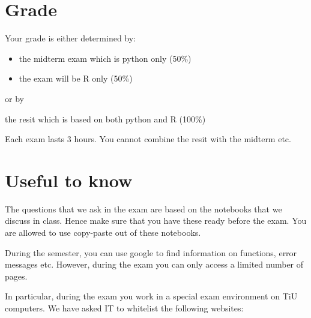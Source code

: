 \documentclass[]{book}
\providecommand{\tightlist}{%
  \setlength{\itemsep}{0pt}\setlength{\parskip}{0pt}}
\begin{document}
\hypertarget{grade}{%
\section{Grade}\label{grade}}

Your grade is either determined by:

\begin{itemize}
\tightlist
\item
  the midterm exam which is python only (50\%)
\item
  the exam will be R only (50\%)
\end{itemize}

or by

the resit which is based on both python and R (100\%)

Each exam lasts 3 hours. You cannot combine the resit with the midterm etc.

\hypertarget{useful-to-know}{%
\section{Useful to know}\label{useful-to-know}}

The questions that we ask in the exam are based on the notebooks that we discuss in class. Hence make sure that you have these ready before the exam. You are allowed to use copy-paste out of these notebooks.

During the semester, you can use google to find information on functions, error messages etc. However, during the exam you can only access a limited number of pages.

In particular, during the exam you work in a special exam environment on TiU computers. We have asked IT to whitelist the following websites:
\end{document}
